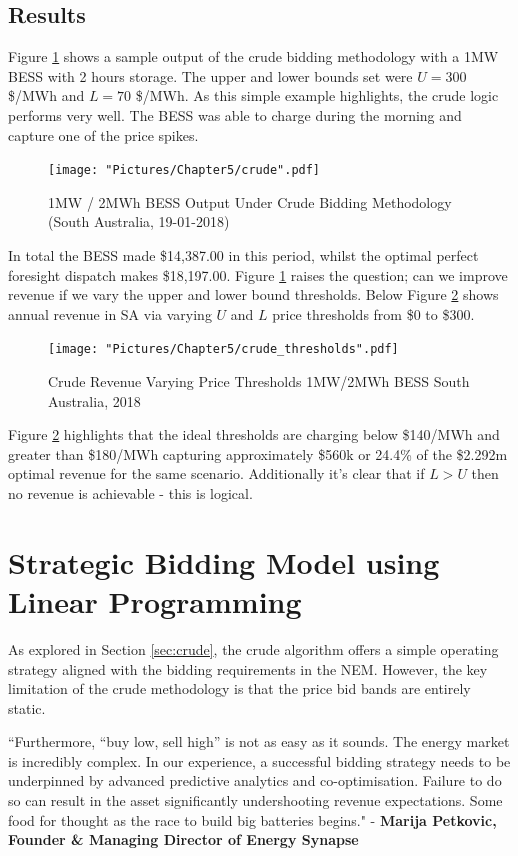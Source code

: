 \subsection{Results}
Figure \ref{fig:crude_sample} shows a sample output of the crude bidding methodology with a 1MW BESS with 2 hours storage. The upper and lower bounds set were $U = 300$ \$/MWh and $L = 70$ \$/MWh. As this simple example highlights, the crude logic performs very well. The BESS was able to charge during the morning and capture one of the price spikes. 
\begin{figure}[H]
    \centering
    \texttt{[image: "Pictures/Chapter5/crude".pdf]}
    \caption{1MW / 2MWh BESS Output Under Crude Bidding Methodology (South Australia, 19-01-2018)}
    \label{fig:crude_sample}
\end{figure}
In total the BESS made \$14,387.00 in this period, whilst the optimal perfect foresight dispatch makes \$18,197.00. Figure \ref{fig:crude_sample} raises the question; can we improve revenue if we vary the upper and lower bound thresholds. Below Figure \ref{fig:crude_thresholds} shows annual revenue in SA via varying $U$ and $L$ price thresholds from \$0 to \$300.
\begin{figure}[H]
    \centering
    \texttt{[image: "Pictures/Chapter5/crude\_thresholds".pdf]}
    \caption{Crude Revenue Varying Price Thresholds 1MW/2MWh BESS
South Australia, 2018}
    \label{fig:crude_thresholds}
\end{figure}
Figure \ref{fig:crude_thresholds} highlights that the ideal thresholds are charging below \$140/MWh and greater than \$180/MWh capturing approximately \$560k or 24.4\% of the \$2.292m  optimal revenue for the same scenario. Additionally it's clear that if $L>U$ then no revenue is achievable - this is logical. 
\section{Strategic Bidding Model using Linear Programming}
As explored in Section \ref{sec:crude}, the crude algorithm offers a simple operating strategy aligned with the bidding requirements in the NEM. However, the key limitation of the crude methodology is that the price bid bands are entirely static. 

\begin{tcolorbox}[colback=ocre!5!white,colframe=ocre]
``Furthermore, “buy low, sell high” is not as easy as it sounds. The energy market is incredibly complex. In our experience, a successful bidding strategy needs to be underpinned by advanced predictive analytics and co-optimisation. Failure to do so can result in the asset significantly undershooting revenue expectations. Some food for thought as the race to build big batteries begins." - \textbf{Marija Petkovic, Founder \& Managing Director of Energy Synapse}
\end{tcolorbox}
